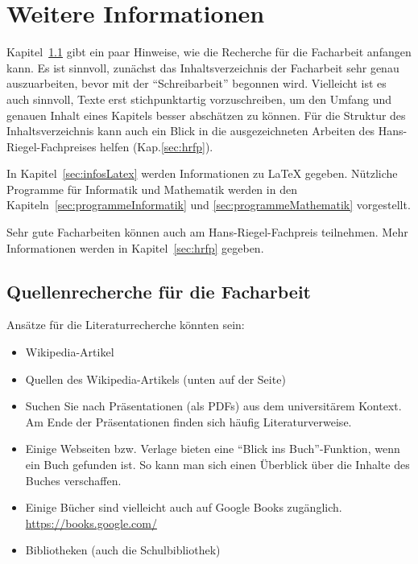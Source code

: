 \documentclass[11pt, a4paper, oneside, openright]{article}
\newcommand \bzw{bzw.\xspace }
\newcommand \Kap{Kap.\xspace }
\begin{document}
\newpage
\section{Weitere Informationen}
\label{sec:weitereInfos}
Kapitel~\ref{sec:quellenfacharbeit} gibt ein paar Hinweise, wie die Recherche für die Facharbeit anfangen kann. Es ist sinnvoll, zunächst das Inhaltsverzeichnis der Facharbeit sehr genau auszuarbeiten, bevor mit der \enquote{Schreibarbeit} begonnen wird. Vielleicht ist es auch sinnvoll, Texte erst stichpunktartig vorzuschreiben, um den Umfang und genauen Inhalt eines Kapitels besser abschätzen zu können. Für die Struktur des Inhaltsverzeichnis kann auch ein Blick in die ausgezeichneten Arbeiten des Hans-Riegel-Fachpreises helfen (\Kap\ref{sec:hrfp}).

In Kapitel~\ref{sec:infosLatex} werden Informationen zu \LaTeX{} gegeben. Nützliche Programme für Informatik und Mathematik werden in den Kapiteln~\ref{sec:programmeInformatik} und \ref{sec:programmeMathematik} vorgestellt.   

Sehr gute Facharbeiten können auch am Hans-Riegel-Fachpreis teilnehmen. Mehr Informationen werden in Kapitel~\ref{sec:hrfp} gegeben.





\subsection{Quellenrecherche für die Facharbeit}
\label{sec:quellenfacharbeit}
Ansätze für die Literaturrecherche könnten sein:

\begin{itemize}
    \item Wikipedia-Artikel
    
    \item Quellen des Wikipedia-Artikels (unten auf der Seite)
    
    \item Suchen Sie nach Präsentationen (als PDFs) aus dem universitärem Kontext. Am Ende der Präsentationen finden sich häufig Literaturverweise. 
    
    \item Einige Webseiten \bzw Verlage bieten eine \enquote{Blick ins Buch}-Funktion, wenn ein Buch gefunden ist. So kann man sich einen Überblick über die Inhalte des Buches verschaffen.
    
    \item Einige Bücher sind vielleicht auch auf Google Books zugänglich. \url{https://books.google.com/}
    
    \item Bibliotheken (auch die Schulbibliothek)
\end{itemize}
\end{document}
